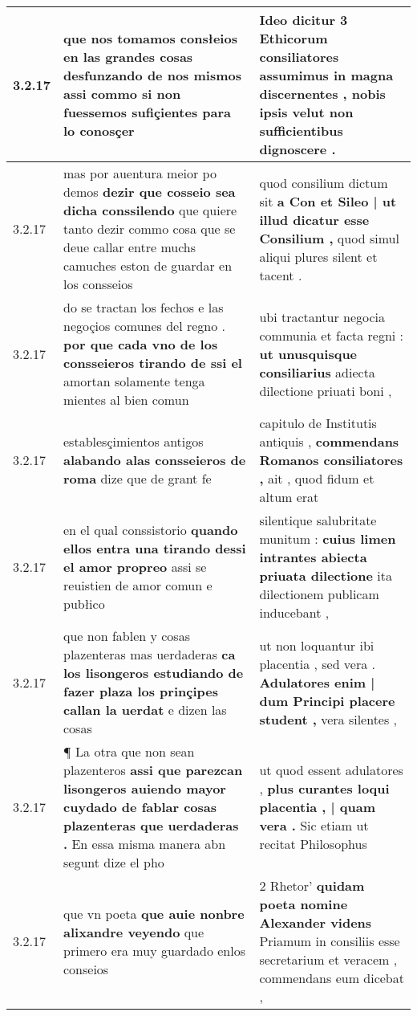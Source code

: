 \begin{tabular}{|p{1cm}|p{6.5cm}|p{6.5cm}|}
3.2.17 & que nos tomamos consłeios \textbf{ en las grandes cosas desfunzando de nos mismos } assi commo si non fuessemos sufiçientes para lo conosçer & Ideo dicitur 3 Ethicorum consiliatores \textbf{ assumimus in magna discernentes , } nobis ipsis velut non sufficientibus dignoscere . \\\hline
3.2.17 & mas por auentura meior po demos \textbf{ dezir que cosseio sea dicha conssilendo } que quiere tanto dezir commo cosa que se deue callar entre muchs camuches eston de guardar en los consseios & quod consilium dictum sit \textbf{ a Con et Sileo | ut illud dicatur esse Consilium , } quod simul aliqui plures silent et tacent . \\\hline
3.2.17 & do se tractan los fechos e las negoçios comunes del regno . \textbf{ por que cada vno de los consseieros tirando de ssi el } amortan solamente tenga mientes al bien comun & ubi tractantur negocia communia et facta regni : \textbf{ ut unusquisque consiliarius } adiecta dilectione priuati boni , \\\hline
3.2.17 & establesçimientos antigos \textbf{ alabando alas consseieros de roma } dize que de grant fe & capitulo de Institutis antiquis , \textbf{ commendans Romanos consiliatores , } ait , quod fidum et altum erat \\\hline
3.2.17 & en el qual conssistorio \textbf{ quando ellos entra una tirando dessi el amor propreo } assi se reuistien de amor comun e pubłico & silentique salubritate munitum : \textbf{ cuius limen intrantes abiecta priuata dilectione } ita dilectionem publicam inducebant , \\\hline
3.2.17 & que non fablen y cosas plazenteras mas uerdaderas \textbf{ ca los lisongeros estudiando de fazer plaza los prinçipes callan la uerdat } e dizen las cosas & ut non loquantur ibi placentia , sed vera . \textbf{ Adulatores enim | dum Principi placere student , } vera silentes , \\\hline
3.2.17 & ¶ La otra que non sean plazenteros \textbf{ assi que parezcan lisongeros auiendo mayor cuydado de fablar cosas plazenteras que uerdaderas . } En essa misma manera abn segunt dize el pho & ut quod essent adulatores , \textbf{ plus curantes loqui placentia , | quam vera . } Sic etiam ut recitat Philosophus \\\hline
3.2.17 & que vn poeta \textbf{ que auie nonbre alixandre veyendo } que primero era muy guardado enlos conseios & 2 Rhetor’ \textbf{ quidam poeta nomine Alexander videns } Priamum in consiliis esse secretarium et veracem , commendans eum dicebat , \\\hline

\end{tabular}

